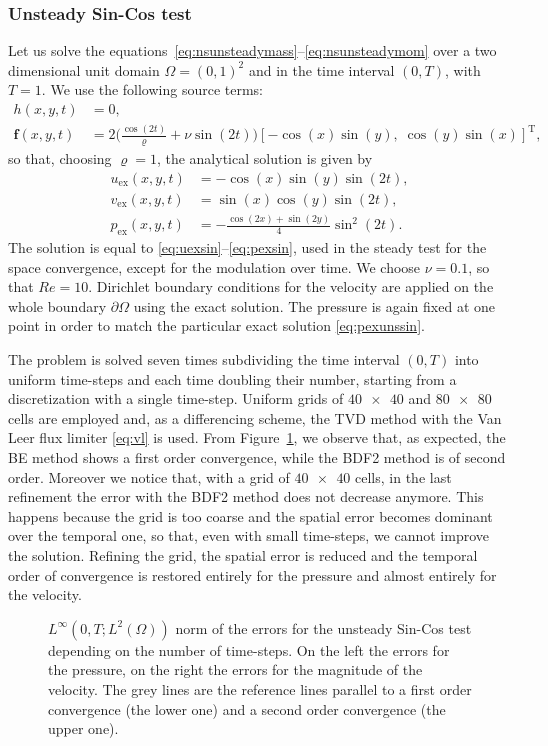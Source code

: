 \subsubsection{Unsteady Sin-Cos test}
Let us solve the equations~\eqref{eq:nsunsteadymass}--\eqref{eq:nsunsteadymom} 
over a two dimensional unit domain $\Omega=(0,1)^2$ and in the time interval 
$(0,T)$, with $T=1$. We use the following source terms:
\begin{align}
h(x,y,t) &= 0,\\
\mathbf{f}(x,y,t) &= 2\Big(\frac{\cos(2t)}{\varrho} + \nu \sin(2t)\Big)[- \cos(x) 
\sin(y), \; 
\cos(y) \sin(x)]^\mathrm{T},
\end{align}
so that, choosing $\varrho=1$, the analytical solution is given by
\begin{align}
\label{eq:uexunssin}	u_\text{ex}(x,y,t) &= -\cos(x)\sin(y)\sin(2t),\\
v_\text{ex}(x,y,t) &= \sin(x)\cos(y)\sin(2t),\\
\label{eq:pexunssin}	p_\text{ex}(x,y,t) &= 
-\frac{\cos(2x)+\sin(2y)}{4}\sin^2(2t).
\end{align}
The solution is equal to \eqref{eq:uexsin}--\eqref{eq:pexsin}, used in the steady test 
for the space convergence, except for the modulation over time. We choose 
$\nu=0.1$, so that $Re=10$. Dirichlet boundary conditions for the velocity are 
applied on the whole boundary $\partial \Omega$ using the exact solution. 
The pressure is again fixed  at one point in order to match the particular exact solution 
\eqref{eq:pexunssin}.

The problem is solved seven times subdividing the time interval $(0,T)$ into 
uniform time-steps and each time doubling their number, starting from a 
discretization with a
single time-step. Uniform grids of $\num{40x40}$ and $\num{80x80}$ cells are 
employed and, as a differencing scheme, the TVD method with the Van Leer flux 
limiter \eqref{eq:vl} is used. From Figure~\ref{fig:timeerr}, we observe that, 
as expected, the BE method shows a first order convergence, while the BDF2 
method is of second order. Moreover we notice that, with a grid of 
$\num{40x40}$ cells, in the last refinement the error with the BDF2 method does 
not decrease anymore. This happens because the grid is too coarse and the 
spatial error becomes dominant over the temporal one, so that, even with small 
time-steps, we cannot improve the solution.
Refining the grid, the spatial error is reduced and the temporal order of convergence is restored entirely for the pressure and almost entirely for the velocity.
\begin{figure}
	\centering
	\subfloat{}
	\subfloat{}
	\caption[$L^\infty(0,T;L^2(\Omega))$ norm of the errors for the unsteady 
	Sin-Cos 
	test]{$L^\infty(0,T;L^2(\Omega))$ norm of the errors for the unsteady 
	Sin-Cos test 
	depending on the number of time-steps. On the left the errors for the 
	pressure, on the right the errors for the magnitude of the velocity. The grey lines are the reference lines parallel to a first order convergence (the lower one) and a
	second order convergence (the upper one).}
	\label{fig:timeerr}
\end{figure}
%
